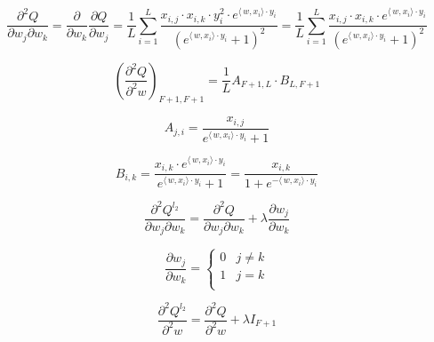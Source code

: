 \documentclass[12pt]{article}
\begin{document}
$$\frac{\partial^2 Q}{\partial w_j \partial w_k} = \frac{\partial}{\partial w_k} \frac{\partial Q}{\partial w_j} = \frac{1}{L}\sum\limits_{i = 1}^{L} \frac{x_{i, j} \cdot x_{i, k} \cdot y_i^2 \cdot e^{\langle\,w,x_i\rangle \cdot y_i}}{(e^{\langle\,w,x_i\rangle \cdot y_i} + 1)^2} = \frac{1}{L}\sum\limits_{i = 1}^{L} \frac{x_{i, j} \cdot x_{i, k} \cdot e^{\langle\,w,x_i\rangle \cdot y_i}}{(e^{\langle\,w,x_i\rangle \cdot y_i} + 1)^2}$$

\[ 
\left( \frac{\partial^2 Q}{\partial^2 w} \right)_{F+1, F+1} =\frac{1}{L} A_{F+1, L} \cdot B_{L, F+1}
\]

$$A_{j, i} = \frac{x_{i, j}}{e^{\langle\,w,x_i\rangle \cdot y_i} + 1}$$

$$B_{i, k} = \frac{x_{i, k} \cdot e^{\langle\,w,x_i\rangle \cdot y_i}}{e^{\langle\,w,x_i\rangle \cdot y_i} + 1} = \frac{x_{i, k} }{1 + e^{-\langle\,w,x_i\rangle \cdot y_i} } $$

$$\frac{\partial^2 Q^{l_2}}{\partial w_j \partial w_k} = \frac{\partial^2 Q}{\partial w_j \partial w_k} + \lambda \frac{\partial w_j}{\partial w_k}$$

\[\frac{\partial w_j}{\partial w_k} = \begin{cases} 
      0 & j \neq k\\
     1 & j = k \\
   \end{cases}
\]


$$\frac{\partial^2 Q^{l_2}}{\partial^2 w} = \frac{\partial^2 Q}{\partial^2 w} + \lambda I_{F+1}$$
\end{document}
